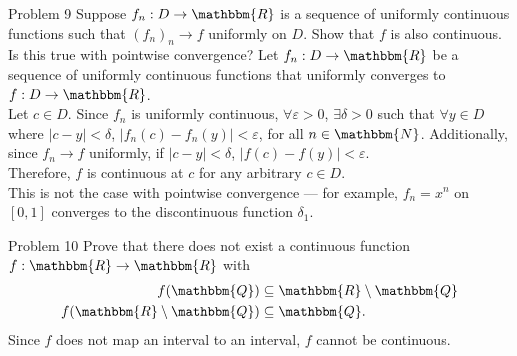 \documentclass[10pt]{extarticle}
\newcommand{\N}{\mathbbm{N}}
\newcommand{\Q}{\mathbbm{Q}}
\newcommand{\R}{\mathbbm{R}}
\begin{document}
  \begin{problem}{Problem 9}
    Suppose $f_n: D\rightarrow \R$ is a sequence of uniformly continuous functions such that $(f_n)_n \rightarrow f$ uniformly on $D$. Show that $f$ is also continuous. Is this true with pointwise convergence?
    \tcblower
    Let $f_n: D\rightarrow \R$ be a sequence of uniformly continuous functions that uniformly converges to $f: D\rightarrow \R$.\\

    Let $c\in D$. Since $f_n$ is uniformly continuous, $\forall \varepsilon > 0$, $\exists \delta > 0$ such that $\forall y\in D$ where $|c-y| < \delta$, $|f_n(c)-f_n(y)| < \varepsilon$, for all $n\in\N$. Additionally, since $f_n\rightarrow f$ uniformly, if $|c-y| < \delta$, $|f(c) - f(y)| < \varepsilon$.\\

     Therefore, $f$ is continuous at $c$ for any arbitrary $c\in D$.\\

     This is not the case with pointwise convergence --- for example, $f_n = x^n$ on $[0,1]$ converges to the discontinuous function $\delta_1$.
  \end{problem}
  \begin{problem}{Problem 10}
    Prove that there does not exist a continuous function $f: \R\rightarrow \R$ with
    \begin{align*}
      f(\Q) &\subseteq \R\setminus\Q\\
      f(\R\setminus\Q) &\subseteq \Q.
    \end{align*}
    \tcblower
    Since $f$ does not map an interval to an interval, $f$ cannot be continuous.
  \end{problem}
\end{document}

